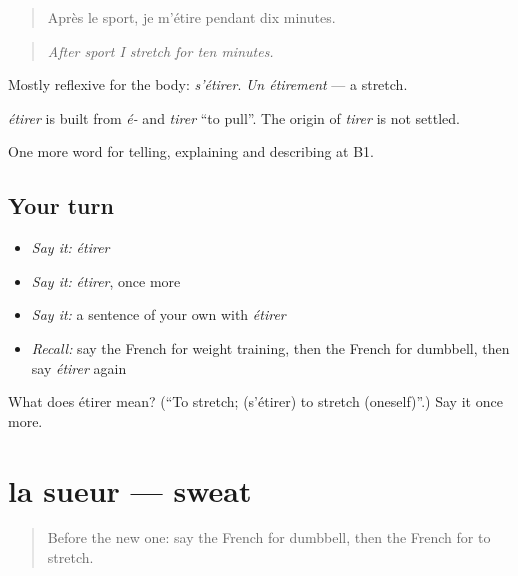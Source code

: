 \begin{quote}
Après le sport, je m'étire pendant dix minutes.
\end{quote}

\begin{quote}
\emph{After sport I stretch for ten minutes.}
\end{quote}

Mostly reflexive for the body: \emph{s'étirer}. \emph{Un étirement} — a stretch.

\begin{cousinweb}
\emph{étirer} is built from \emph{é-} and \emph{tirer} \textquotedblleft{}to pull\textquotedblright{}. The origin of \emph{tirer} is not settled.
\end{cousinweb}

\begin{grammarlens}[title={What you've built}]
One more word for telling, explaining and describing at B1.
\end{grammarlens}

\subsection*{Your turn}
\begin{itemize}
\raggedright
  \item \emph{Say it:} \emph{étirer}
  \item \emph{Say it:} \emph{étirer}, once more
  \item \emph{Say it:} a sentence of your own with \emph{étirer}
  \item \emph{Recall:} say the French for weight training, then the French for dumbbell, then say \emph{étirer} again
\end{itemize}

\begin{tcolorbox}[breakable,colback=teal!4,colframe=teal!35!black,title={Before you move on}]
What does étirer mean? (\textquotedblleft{}To stretch; (s'étirer) to stretch (oneself)\textquotedblright{}.) Say it once more.
\end{tcolorbox}
\section[la sueur]{la sueur — sweat}

\label{lesson:FR-C504-sueur}



\begin{quote}
Before the new one: say the French for dumbbell, then the French for to stretch.
\end{quote}


